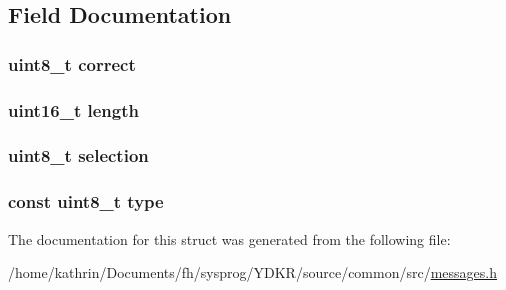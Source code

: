 \subsection{Field Documentation}
\hypertarget{structquestion__result_a9e77be6b2d809446ab999d825cfb84f3}{
\subsubsection[{correct}]{\setlength{\rightskip}{0pt plus 5cm}uint8\_\-t {\bf correct}}}
\label{structquestion__result_a9e77be6b2d809446ab999d825cfb84f3}
\hypertarget{structquestion__result_a1892eba2086d12ac2b09005aeb09ea3b}{
\subsubsection[{length}]{\setlength{\rightskip}{0pt plus 5cm}uint16\_\-t {\bf length}}}
\label{structquestion__result_a1892eba2086d12ac2b09005aeb09ea3b}
\hypertarget{structquestion__result_af190e8c7f8c6caf004f782b3aa7b5021}{
\subsubsection[{selection}]{\setlength{\rightskip}{0pt plus 5cm}uint8\_\-t {\bf selection}}}
\label{structquestion__result_af190e8c7f8c6caf004f782b3aa7b5021}
\hypertarget{structquestion__result_aca7dafb0092715a03dd40f45fc607f2a}{
\subsubsection[{type}]{\setlength{\rightskip}{0pt plus 5cm}const uint8\_\-t {\bf type}}}
\label{structquestion__result_aca7dafb0092715a03dd40f45fc607f2a}


The documentation for this struct was generated from the following file:\begin{DoxyCompactItemize}
\item 
/home/kathrin/Documents/fh/sysprog/YDKR/source/common/src/\hyperlink{messages_8h}{messages.h}\end{DoxyCompactItemize}
